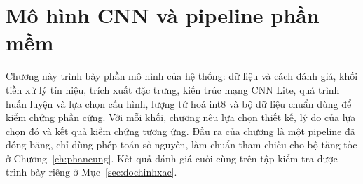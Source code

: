 \chapter{Mô hình CNN và pipeline phần mềm}\label{ch:cnn}

Chương này trình bày phần mô hình của hệ thống: dữ liệu và cách đánh giá, khối tiền xử lý tín hiệu, trích xuất đặc trưng, kiến trúc mạng CNN Lite, quá trình huấn luyện và lựa chọn cấu hình, lượng tử hoá int8 và bộ dữ liệu chuẩn dùng để kiểm chứng phần cứng.
Với mỗi khối, chương nêu lựa chọn thiết kế, lý do của lựa chọn đó và kết quả kiểm chứng tương ứng.
Đầu ra của chương là một pipeline đã đóng băng, chỉ dùng phép toán số nguyên, làm chuẩn tham chiếu cho bộ tăng tốc ở Chương~\ref{ch:phancung}.
Kết quả đánh giá cuối cùng trên tập kiểm tra được trình bày riêng ở Mục~\ref{sec:dochinhxac}.








